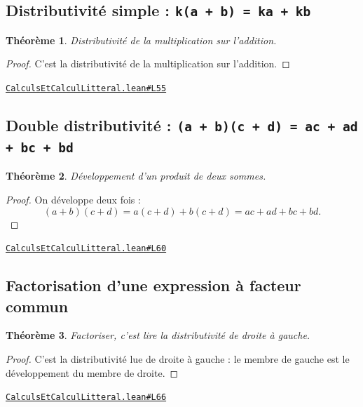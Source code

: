 \documentclass[11pt,a4paper]{article}
\theoremstyle{definition}
\theoremstyle{plain}
\newtheorem{theoreme}{Théorème}
\newcommand{\source}[2]{\par\smallskip\noindent\hfill{\footnotesize\href{#1}{\texttt{#2}}}\par\smallskip}
\begin{document}
\subsection{Distributivité simple : \texttt{k(a + b) = ka + kb}}

\begin{theoreme}
Distributivité de la multiplication sur l'addition.
\end{theoreme}

\begin{proof}
C'est la distributivité de la multiplication sur l'addition.
\end{proof}
\source{https://github.com/Commutator-IO/learn-lean/blob/main/cours/01-college/01-nombres-et-calculs/CalculsEtCalculLitteral.lean\#L55}{CalculsEtCalculLitteral.lean\#L55}

\subsection{Double distributivité : \texttt{(a + b)(c + d) = ac + ad + bc + bd}}

\begin{theoreme}
Développement d'un produit de deux sommes.
\end{theoreme}

\begin{proof}
On développe deux fois :
\[
(a+b)(c+d) = a(c+d) + b(c+d) = ac + ad + bc + bd .
\]
\end{proof}
\source{https://github.com/Commutator-IO/learn-lean/blob/main/cours/01-college/01-nombres-et-calculs/CalculsEtCalculLitteral.lean\#L60}{CalculsEtCalculLitteral.lean\#L60}

\subsection{Factorisation d'une expression à facteur commun}

\begin{theoreme}
Factoriser, c'est lire la distributivité de droite à gauche.
\end{theoreme}

\begin{proof}
C'est la distributivité lue de droite à gauche : le membre de gauche est le
développement du membre de droite.
\end{proof}
\source{https://github.com/Commutator-IO/learn-lean/blob/main/cours/01-college/01-nombres-et-calculs/CalculsEtCalculLitteral.lean\#L66}{CalculsEtCalculLitteral.lean\#L66}
\end{document}
